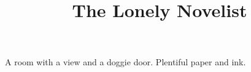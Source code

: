 \documentclass{article}
\title{The Lonely Novelist}
\begin{document}
A room with a view and a doggie door. Plentiful paper and ink.
\end{document}
